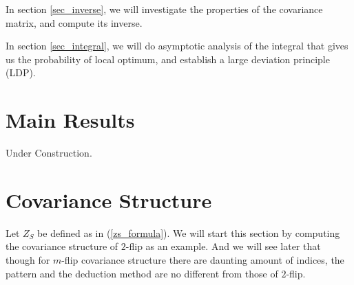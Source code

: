 \documentclass[10pt]{article}
\newenvironment{Proof of lemma}{\noindent{\bf Proof of Lemma}}{\hfill$\Box$\newline}
\newenvironment{Proof of claim}{\noindent{\bf Proof of claim}}{\hfill$\Box$\newline}
\newenvironment{Proof of theorem}{\noindent{\bf Proof of Theorem}}{\hfill\scriptsize{$\Box$}\newline}
\newenvironment{Proof of theorems}{\noindent{\bf Proof of Theorems}}{\hfill$\Box$\newline}
\newenvironment{Proof of proposition}{\noindent{\bf Proof of Proposition}}{\hfill$\Box$\newline}
\newenvironment{Proof of propositions}{\noindent{\bf Proof of Propositions}}{\hfill$\Box$\newline}
\newenvironment{Proof of exercise}{\noindent{\it Proof of Exercise:}}{\hfill$\Box$}
\numberwithin{equation}{section}
\begin{document}
In section \ref{sec_inverse}, we will investigate the properties of the covariance matrix, and compute its inverse.

In section \ref{sec_integral}, we will do asymptotic analysis of the integral that gives us the probability of local optimum, and establish a large deviation principle (LDP).
\section{Main Results} \label{sec_result}
Under Construction.
\section{Covariance Structure} \label{sec_covariance}
Let $Z_S$ be defined as in (\ref{zs_formula}). We will start this section by computing the covariance structure of $2$-flip as an example. And we will see later that though for $m$-flip covariance structure there are daunting amount of indices, the pattern and the deduction method are no different from those of $2$-flip.
\end{document}
